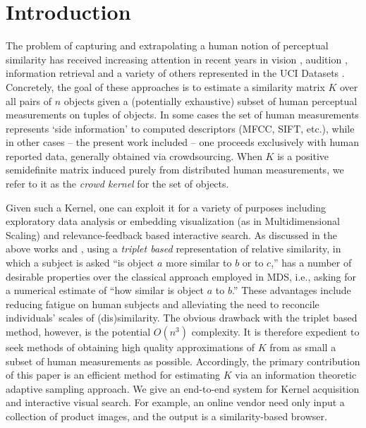 \documentclass{article}
\begin{document}
\section{Introduction}
The problem of capturing and extrapolating a human notion of perceptual similarity has received increasing attention in recent years in vision \cite{Agarwal07}, audition \cite{McFee09}, information retrieval \cite{Schultz03} and a variety of others represented in the UCI Datasets \cite{Xing02,Huang10}.  Concretely, the goal of these approaches is to estimate a similarity matrix $K$ over all pairs of $n$ objects given a (potentially exhaustive) subset of human perceptual measurements on tuples of objects.  In some cases the set of human measurements represents `side information' to computed descriptors (MFCC, SIFT, etc.), while in other cases -- the present work included -- one proceeds exclusively with human reported data, generally obtained via crowdsourcing.  When $K$ is a positive semidefinite matrix induced purely from distributed human measurements, we refer to it as the {\em crowd kernel} for the set of objects.

Given such a Kernel, one can exploit it for a variety of purposes including exploratory data analysis or embedding visualization (as in Multidimensional Scaling) and relevance-feedback based interactive search.  As discussed in the above works and \cite{Kendall90}, using a {\em triplet based} representation of relative similarity, in which a subject is asked ``is object $a$ more similar to $b$ or to $c$,'' has a number of desirable properties over the classical approach employed in MDS, i.e., asking for a numerical estimate of ``how similar is object $a$ to $b$.''  These advantages include reducing fatigue on human subjects and alleviating the need to reconcile individuals' scales of (dis)similarity.  The obvious drawback with the triplet based method, however, is the potential $O(n^3)$ complexity.  It is therefore expedient to seek methods of obtaining high quality approximations of $K$ from as small a subset of human measurements as possible.  Accordingly, the primary contribution of this paper is an efficient method for estimating $K$ via an information theoretic adaptive sampling approach.  We give an end-to-end system for Kernel acquisition and interactive visual search.  For example, an online vendor need only input a collection of product images, and the output is a similarity-based browser.
\end{document}
